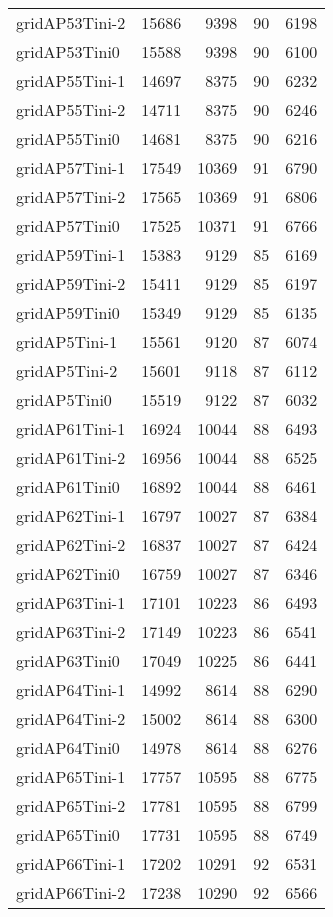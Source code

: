 \begin{longtable}{lrrrr}
gridAP53Tini-2 & 15686 & 9398 & 90 & 6198 \\
gridAP53Tini0 & 15588 & 9398 & 90 & 6100 \\
gridAP55Tini-1 & 14697 & 8375 & 90 & 6232 \\
gridAP55Tini-2 & 14711 & 8375 & 90 & 6246 \\
gridAP55Tini0 & 14681 & 8375 & 90 & 6216 \\
gridAP57Tini-1 & 17549 & 10369 & 91 & 6790 \\
gridAP57Tini-2 & 17565 & 10369 & 91 & 6806 \\
gridAP57Tini0 & 17525 & 10371 & 91 & 6766 \\
gridAP59Tini-1 & 15383 & 9129 & 85 & 6169 \\
gridAP59Tini-2 & 15411 & 9129 & 85 & 6197 \\
gridAP59Tini0 & 15349 & 9129 & 85 & 6135 \\
gridAP5Tini-1 & 15561 & 9120 & 87 & 6074 \\
gridAP5Tini-2 & 15601 & 9118 & 87 & 6112 \\
gridAP5Tini0 & 15519 & 9122 & 87 & 6032 \\
gridAP61Tini-1 & 16924 & 10044 & 88 & 6493 \\
gridAP61Tini-2 & 16956 & 10044 & 88 & 6525 \\
gridAP61Tini0 & 16892 & 10044 & 88 & 6461 \\
gridAP62Tini-1 & 16797 & 10027 & 87 & 6384 \\
gridAP62Tini-2 & 16837 & 10027 & 87 & 6424 \\
gridAP62Tini0 & 16759 & 10027 & 87 & 6346 \\
gridAP63Tini-1 & 17101 & 10223 & 86 & 6493 \\
gridAP63Tini-2 & 17149 & 10223 & 86 & 6541 \\
gridAP63Tini0 & 17049 & 10225 & 86 & 6441 \\
gridAP64Tini-1 & 14992 & 8614 & 88 & 6290 \\
gridAP64Tini-2 & 15002 & 8614 & 88 & 6300 \\
gridAP64Tini0 & 14978 & 8614 & 88 & 6276 \\
gridAP65Tini-1 & 17757 & 10595 & 88 & 6775 \\
gridAP65Tini-2 & 17781 & 10595 & 88 & 6799 \\
gridAP65Tini0 & 17731 & 10595 & 88 & 6749 \\
gridAP66Tini-1 & 17202 & 10291 & 92 & 6531 \\
gridAP66Tini-2 & 17238 & 10290 & 92 & 6566 \\

\end{longtable}
